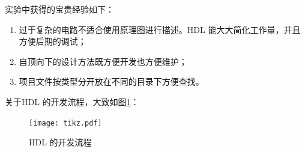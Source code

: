 \documentclass[twoside, openright]{article}
\begin{document}
实验中获得的宝贵经验如下：

\begin{enumerate}

	\item 过于复杂的电路不适合使用原理图进行描述。HDL 能大大简化工作量，并且
		方便后期的调试；

	\item 自顶向下的设计方法既方便开发也方便维护；

	\item 项目文件按类型分开放在不同的目录下方便查找。

\end{enumerate}

关于HDL 的开发流程，大致如图\ref{fig:HDL 的开发流程}：

\begin{figure}[htbp]
	\centering
	\texttt{[image: tikz.pdf]}
	\caption{HDL 的开发流程}
	\label{fig:HDL 的开发流程}
\end{figure}

\newpage


\setcounter{section}{0}




\end{document}
